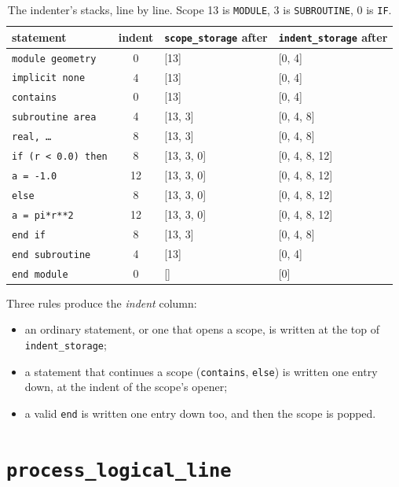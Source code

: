 \documentclass[11pt,a4paper,openany]{book}
\newcommand{\code}[1]{\texttt{\small #1}}
\begin{document}
\begin{table}[ht]
\centering\small
\begin{tabular}{@{}l c l l@{}}
\toprule
statement & indent & \code{scope\_storage} after & \code{indent\_storage} after\\
\midrule
\code{module geometry}  & 0  & [13]          & [0, 4]\\
\code{implicit none}    & 4  & [13]          & [0, 4]\\
\code{contains}         & 0  & [13]          & [0, 4]\\
\code{subroutine area}  & 4  & [13, 3]       & [0, 4, 8]\\
\code{real, \ldots}     & 8  & [13, 3]       & [0, 4, 8]\\
\code{if (r < 0.0) then}& 8  & [13, 3, 0]    & [0, 4, 8, 12]\\
\code{a = -1.0}         & 12 & [13, 3, 0]    & [0, 4, 8, 12]\\
\code{else}             & 8  & [13, 3, 0]    & [0, 4, 8, 12]\\
\code{a = pi*r**2}      & 12 & [13, 3, 0]    & [0, 4, 8, 12]\\
\code{end if}           & 8  & [13, 3]       & [0, 4, 8]\\
\code{end subroutine}   & 4  & [13]          & [0, 4]\\
\code{end module}       & 0  & []            & [0]\\
\bottomrule
\end{tabular}
\caption{The indenter's stacks, line by line. Scope 13 is \code{MODULE}, 3 is
\code{SUBROUTINE}, 0 is \code{IF}.}
\label{tab:stacks}
\end{table}

Three rules produce the \emph{indent} column:

\begin{itemize}
  \item an ordinary statement, or one that opens a scope, is written at the top of
    \code{indent\_storage};
  \item a statement that continues a scope (\code{contains}, \code{else})
    is written one entry down, at the indent of the scope's opener;
  \item a valid \code{end} is written one entry down too, and then the scope is
    popped.
\end{itemize}

\section{\texttt{process\_logical\_line}}
\end{document}
